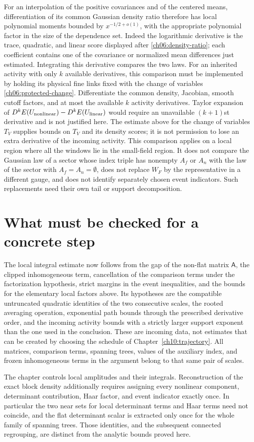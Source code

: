 For an interpolation of the positive covariances and of the centered
means, differentiation of its common Gaussian density ratio therefore
has local polynomial moments bounded by $x^{-1/2+o(1)}$, with the
appropriate polynomial factor in the size of the dependence set.
Indeed the logarithmic derivative is the trace, quadratic, and linear
score displayed after \eqref{ch06:density-ratio}; each coefficient
contains one of the covariance or normalized mean differences just
estimated. Integrating this derivative compares the two laws.
For an inherited activity with only $k$ available derivatives, this
comparison must be implemented by holding its physical fine links fixed
with the change of variables \eqref{ch06:protected-change}. Differentiate the common
density, Jacobian, smooth cutoff factors, and at most the available
$k$ activity derivatives. Taylor expansion of
$D^k E(U_{\rm nonlinear})-D^k E(U_{\rm linear})$ would require an
unavailable $(k+1)$st derivative and is not justified here.
The estimate above for the change of variables $T_V$ supplies bounds on
$T_V$ and its density scores; it is not permission to lose an extra
derivative of the incoming activity.
This comparison applies on a local region where all the windows lie in
the small-field region. It does not compare the Gaussian law of a sector whose index triple has nonempty $A_f$ or $A_n$ with the law of the sector with $A_f=A_n=\emptyset$,
does not replace $W_F$ by the representative in a different gauge,
and does not identify separately chosen event indicators. Such replacements need
their own tail or support decomposition.

\section{What must be checked for a concrete step}

The local integral estimate now follows from the gap of the non-flat matrix $\mathsf A$, the clipped
inhomogeneous term, cancellation of the comparison terms under the factorization hypothesis, strict margins in the event inequalities, and the
bounds for the elementary local factors above. Its hypotheses are the compatible untruncated
quadratic identities of the two consecutive scales, the rooted averaging operation, exponential path bounds
through the prescribed derivative order, and the incoming activity bounds
with a strictly larger support exponent than the one used in the conclusion. These are incoming data, not estimates
that can be created by choosing the schedule of Chapter~\ref{ch10:trajectory}. All matrices,
comparison terms, spanning trees, values of the auxiliary index, and frozen inhomogeneous terms in the argument belong to
that same pair of scales.

The chapter controls local amplitudes and their integrals. Reconstruction
of the exact block density additionally requires assigning every
nonlinear component, determinant contribution, Haar factor, and event indicator exactly
once. In particular the two near sets for local determinant terms and
Haar terms need not coincide, and the flat determinant scalar is
extracted only once for the whole family of spanning trees. Those identities, and the
subsequent connected regrouping, are distinct from the analytic bounds
proved here.
